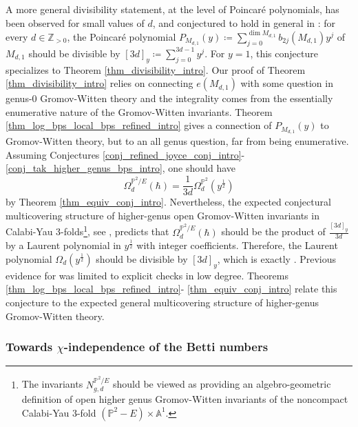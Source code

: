 \documentclass[11pt,letterpaper]{amsart}
\newcommand\A{\mathbb A}
\newcommand\PP{\mathbb P}
\newcommand\Z{\mathbb Z}
\begin{document}
A more general divisibility statement, at the level of Poincar\'e polynomials, has been observed for small values of $d$, and conjectured to hold in general in \cite[Conjecture 4.15]{choi2018local}: for every $d \in \Z_{>0}$, the Poincar\'e polynomial $P_{M_{d,1}}(y) \coloneq \sum_{j=0}^{\dim M_{d,1}} b_{2j}(M_{d,1}) y^j$ of $M_{d,1}$ should be divisible by 
$[3d]_y \coloneq \sum_{j=0}^{3d-1}y^j$. For $y=1$, this conjecture specializes to Theorem \ref{thm_divisibility_intro}. Our proof of Theorem 
\ref{thm_divisibility_intro} relies on connecting $e(M_{d,1})$ with some question in 
genus-$0$ Gromov-Witten theory and the integrality comes from the essentially enumerative nature of the Gromov-Witten 
invariants. Theorem
\ref{thm_log_bps_local_bps_refined_intro}
gives a connection of $P_{M_{d,1}}(y)$
to Gromov-Witten theory, but to an all genus question, far from being enumerative. 
Assuming Conjectures \ref{conj_refined_joyce_conj_intro}-\ref{conj_tak_higher_genus_bps_intro}, one should have 
\[ \Omega_d^{\PP^2/E}(\hbar)=
\frac{1}{3d} \Omega_d^{\PP^2}(y^{\frac{1}{2}}) \]
by Theorem \ref{thm_equiv_conj_intro}. Nevertheless, 
the expected conjectural multicovering structure of higher-genus open Gromov-Witten invariants in Calabi-Yau 3-folds\footnote{The invariants $N_{g,d}^{\PP^2/E}$ should be viewed as providing an algebro-geometric definition of open higher genus Gromov-Witten invariants of the noncompact Calabi-Yau 3-fold $(\PP^2-E) \times \A^1$.}, see \cite[formula 3.31]{MR1806596}, predicts that $\Omega_{d}^{\PP^2/E}(\hbar)$ should be the product of $\frac{[3d]_y}{3d}$ by a Laurent polynomial in $y^{\frac{1}{2}}$ with integer coefficients. Therefore, the Laurent polynomial
$\Omega_{d}(y^{\frac{1}{2}})$ should be divisible by $[3d]_y$, which is exactly  \cite[Conjecture 4.15]{choi2018local}. Previous evidence for \cite[Conjecture 4.15]{choi2018local} was limited to explicit checks in low degree. Theorems \ref{thm_log_bps_local_bps_refined_intro}-
\ref{thm_equiv_conj_intro} relate this conjecture to
the expected general multicovering structure of higher-genus Gromov-Witten theory.




\subsubsection{Towards $\chi$-independence of the Betti numbers}
\end{document}
